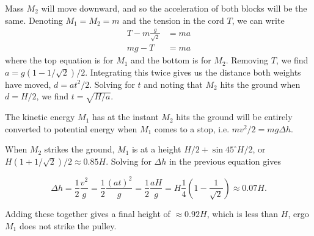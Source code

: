 \documentclass[../feynman-lectures-on-physics.tex]{subfiles}
\begin{document}
\begin{questions}

\begin{solution}
	Mass $M_2$ will move downward, and so the acceleration of both blocks will be the same. Denoting $M_1 = M_2 = m$ and the tension in the cord $T$, we can write
	\begin{align}
		T - m\frac{g}{\sqrt{2}} &= ma \\
		mg - T &= ma
	\end{align}
	where the top equation is for $M_1$ and the bottom is for $M_2$. Removing $T$, we find $a = g(1 - 1/\sqrt{2})/2$. Integrating this twice gives us the distance both weights have moved, $d = at^2/2$. Solving for $t$ and noting that $M_2$ hits the ground when $d = H/2$, we find $t = \sqrt{H/a}$.

	The kinetic energy $M_1$ has at the instant $M_2$ hits the ground will be entirely converted to potential energy when $M_1$ comes to a stop, i.e. $mv^2/2 = mg\Delta{h}$. 

	When $M_2$ strikes the ground, $M_1$ is at a height $H/2 + \sin{45^\circ}H/2$, or $H(1 + 1/\sqrt{2})/2 \approx 0.85H$. Solving for $\Delta{h}$ in the previous equation gives

	\[
	\Delta{h} = \frac{1}{2}\frac{v^2}{g} = \frac{1}{2}\frac{(at)^2}{g} = \frac{1}{2}\frac{aH}{g} = H\frac{1}{4}(1 - \frac{1}{\sqrt{2}}) \approx 0.07H
	.\] 

	Adding these together gives a final height of $\approx 0.92H$, which is less than $H$, ergo $M_1$ does not strike the pulley.
\end{solution}


\end{questions}
\end{document}
